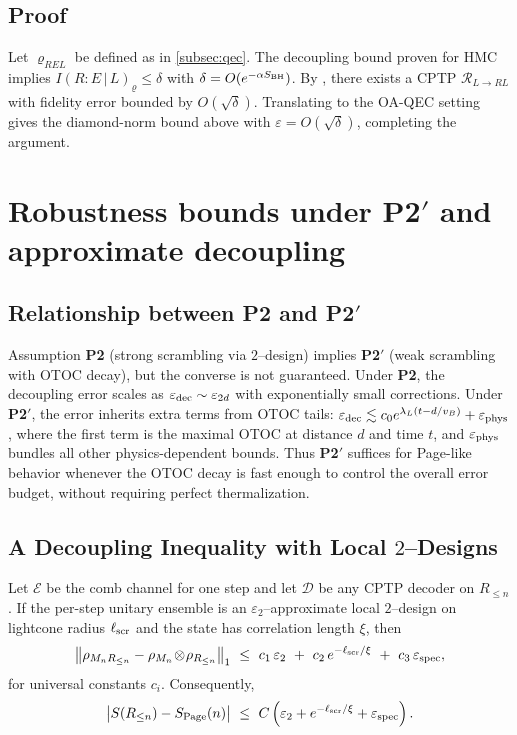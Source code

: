 \documentclass[11pt,a4paper]{article}
\providecommand{\texorpdfstring}[2]{#1}
\newcommand{\Ptwo}{\textbf{P2}\xspace}
\newcommand{\PtwoPrime}{\textbf{P2$'$}\xspace}
\newcommand{\HMC}{\textsc{HMC}\xspace}
\theoremstyle{plain}
\theoremstyle{definition}
\theoremstyle{remark}
\begin{document}
\subsection{Proof}
Let $\varrho_{REL}$ be defined as in \cref{subsec:qec}.
The decoupling bound proven for \HMC{} implies $I(R{:}E\,|\,L)_{\varrho}\le \delta$ with $\delta=O(e^{-\alpha S_{\rm BH}})$.
By \cite{FawziRenner:2015}, there exists a CPTP $\mathcal{R}_{L\to RL}$ with fidelity error bounded by $O(\sqrt{\delta})$.
Translating to the OA-QEC setting gives the diamond-norm bound above with $\varepsilon=O(\sqrt{\delta})$, completing the argument.

\section{Robustness bounds under \texorpdfstring{\PtwoPrime}{P2'} and approximate decoupling}

\label{app:robustness} %

\subsection{Relationship between \Ptwo{} and \texorpdfstring{\PtwoPrime}{P2'}}
Assumption \Ptwo{} (strong scrambling via $2$--design) implies \PtwoPrime{} (weak scrambling with OTOC decay), but the converse is not guaranteed. Under \Ptwo{}, the decoupling error scales as $\varepsilon_{\rm dec} \sim \varepsilon_{2d}$ with exponentially small corrections. Under \PtwoPrime{}, the error inherits extra terms from OTOC tails: $\varepsilon_{\rm dec} \lesssim c_0 e^{\lambda_L(t - d/v_B)} + \varepsilon_{\rm phys}$, where the first term is the maximal OTOC at distance $d$ and time $t$, and $\varepsilon_{\rm phys}$ bundles all other physics-dependent bounds. Thus \PtwoPrime{} suffices for Page-like behavior whenever the OTOC decay is fast enough to control the overall error budget, without requiring perfect thermalization.

\subsection{A Decoupling Inequality with Local \texorpdfstring{$2$}{2}--Designs}
Let $\mathcal{E}$ be the comb channel for one step and let $\mathcal{D}$ be any CPTP decoder on $R_{\le n}$. If the per-step unitary ensemble is an $\varepsilon_2$--approximate local $2$--design on lightcone radius $\ell_{\rm scr}$ and the state has correlation length $\xi$, then
\begin{equation}
\left\| \rho_{M_n R_{\le n}} - \rho_{M_n}\!\otimes\!\rho_{R_{\le n}} \right\|_1 \ \le\ c_1\,\varepsilon_2\ +\ c_2\,e^{-\ell_{\rm scr}/\xi}\ +\ c_3\,\varepsilon_{\rm spec},
\end{equation}
for universal constants $c_i$. Consequently,
\begin{equation}
\big| S(R_{\le n}) - S_{\rm Page}(n) \big| \ \le\ C\left(\varepsilon_2 + e^{-\ell_{\rm scr}/\xi} + \varepsilon_{\rm spec}\right).
\end{equation}
\end{document}

